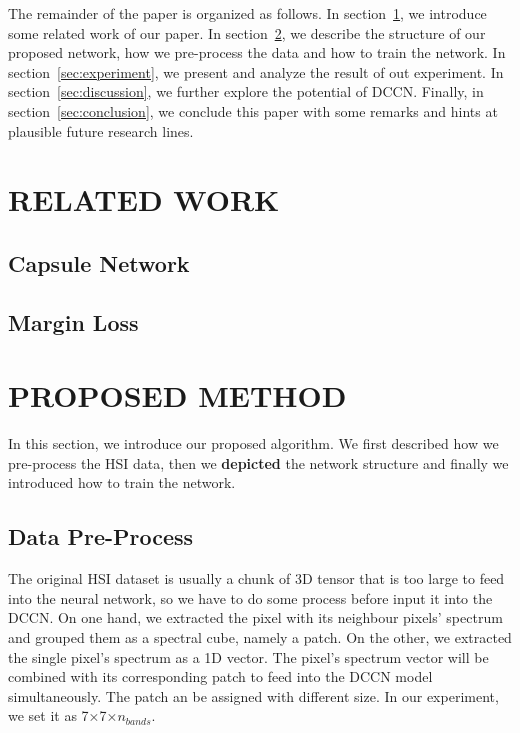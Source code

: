 \documentclass{article}
\begin{document}
	The remainder of the paper is organized as follows.
	In section~\ref{sec:related-works}, we introduce some related work of our paper.
	In section~\ref{sec:proposed-method}, we describe the structure of our proposed network, how we pre-process the data
	and how to train the network.
	In section~\ref{sec:experiment}, we present and analyze the result of out experiment.
	In section~\ref{sec:discussion}, we further explore the potential of DCCN\@.
	Finally, in section~\ref{sec:conclusion}, we conclude this paper with some remarks and hints at plausible future
	research lines.


	\section{RELATED WORK}\label{sec:related-works}

	\subsection{Capsule Network}\label{subsec:capsule-network}

	\subsection{Margin Loss}\label{subsec:margin-loss}


	\section{PROPOSED METHOD}\label{sec:proposed-method}

	In this section, we introduce our proposed algorithm.
	We first described how we pre-process the HSI data, then we \textbf{depicted} the network structure and finally we
	introduced how to train the network.

	\subsection{Data Pre-Process}\label{subsec:data-pre-process}
	The original HSI dataset is usually a chunk of 3D tensor that is too large to feed into the neural network, so we
	have to do some process before input it into the DCCN\@.
	On one hand, we extracted the pixel with its neighbour pixels' spectrum and grouped them as a spectral cube, namely
	a patch.
	On the other, we extracted the single pixel's spectrum as a 1D vector.
	The pixel's spectrum vector will be combined with its corresponding patch to feed into the DCCN model simultaneously.
	The patch an be assigned with different size.
	In our experiment, we set it as 7×7×$n_{bands}$.
\end{document}
